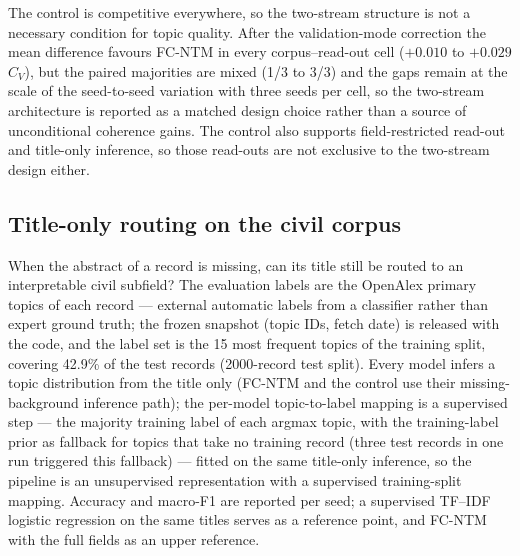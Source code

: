 \documentclass[Journal,letterpaper]{ascelike-new}
\newcommand{\fcntm}{FC-NTM}
\begin{document}
The control is competitive everywhere, so the two-stream structure is not a necessary condition
for topic quality. After the validation-mode correction the mean difference favours \fcntm{} in
every corpus--read-out cell ($+0.010$ to $+0.029$ $C_V$), but the paired majorities are mixed
(1/3 to 3/3) and the gaps remain at the scale of the seed-to-seed variation with three seeds per
cell, so the two-stream architecture is reported as a matched design choice rather than a source of unconditional coherence gains.
The control also supports
field-restricted read-out and title-only inference, so those read-outs are not exclusive to the
two-stream design either.

\subsection{Title-only routing on the civil corpus}

When the abstract of a record is missing, can its title still be routed to an interpretable civil
subfield? The evaluation labels are the OpenAlex primary topics of each record --- external
automatic labels from a classifier rather than expert ground truth; the frozen snapshot (topic
IDs, fetch date) is released with the code, and the label set is the 15 most frequent topics of
the training split, covering 42.9\% of the test records (2000-record test split). Every model
infers a topic distribution from the title only (\fcntm{} and the control use their
missing-background inference path); the per-model topic-to-label mapping is a supervised step ---
the majority training label of each argmax topic, with the training-label prior as fallback for
topics that take no training record (three test records in one run triggered this fallback) ---
fitted on the same title-only inference, so the pipeline is an unsupervised representation with
a supervised training-split mapping. Accuracy and
macro-F1 are reported per seed; a supervised TF--IDF logistic regression on the same titles
serves as a reference point, and \fcntm{} with the full fields as an upper reference.
\end{document}
